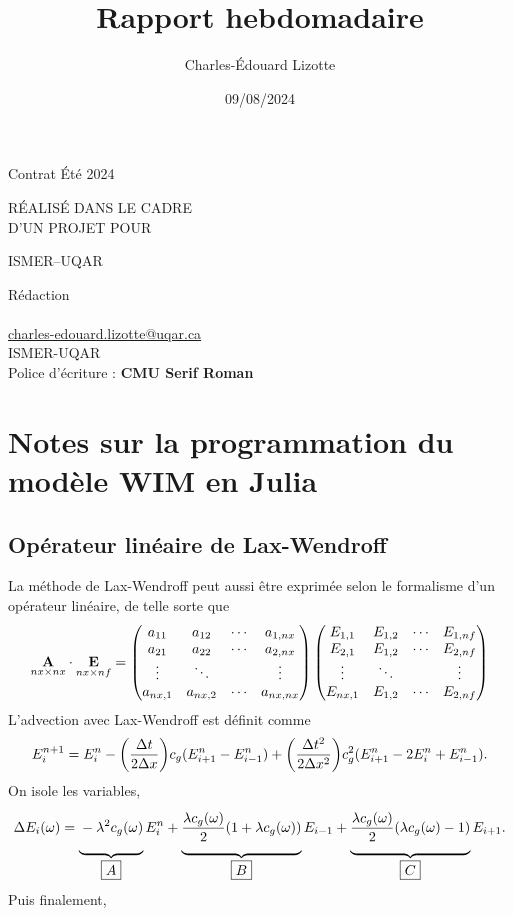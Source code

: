 \documentclass[10pt]{article}
\author{Charles-Édouard Lizotte}
\date{09/08/2024}
\title{Rapport hebdomadaire}
\makeatletter
\numberwithin{equation}{section}
\newcommand{\venti}{\vphantom{\sum_x^x}}
\newcommand{\mytitlepage}{
\begin{titlepage}
\begin{center}
{\Huge \thesubtitle \par}
\vspace{2cm}
{\Huge \MakeUppercase{\thetitle} \par}
\vspace{2cm}
RÉALISÉ DANS LE CADRE\\ D'UN PROJET POUR \par
\vspace{2cm}
{\Huge ISMER--UQAR \par}
\vspace{2cm}
{\thedate}
\end{center}
\vfill
Rédaction \\
{\theauthor}\\
\url{charles-edouard.lizotte@uqar.ca}\\
ISMER-UQAR\\
Police d'écriture : \textbf{CMU Serif Roman}
\end{titlepage}
}
\newcommand{\thesubtitle}{Contrat Été 2024}
\makeatother
\begin{document}
\mytitlepage
\tableofcontents\newpage
\section{Notes sur la programmation du modèle WIM en Julia}
\label{sec:org23d8782}

\subsection{Opérateur linéaire de Lax-Wendroff}
\label{sec:org9ca8214}
La méthode de Lax-Wendroff peut aussi être exprimée selon le formalisme d'un opérateur linéaire, de telle sorte que
\begin{equation}
   \underset{nx\times nx}{\mathbf{A}}\cdot\underset{nx\times nf}{\vb{E}} = \begin{pmatrix}
       a_{11} & a_{12} & \cdots & a_{1,nx} \\
       a_{21} & a_{22} & \cdots & a_{2,nx} \\
       \vdots & \ddots &  & \vdots \\
       a_{nx,1} & a_{nx,2} & \cdots & a_{nx,nx} \\
   \end{pmatrix}\begin{pmatrix}
       E_{1,1} & E_{1,2} & \cdots & E_{1,nf}\\ 
       E_{2,1} & E_{1,2} & \cdots & E_{2,nf}\\
       \vdots & \ddots &  & \vdots\\
       E_{nx,1} & E_{1,2} & \cdots & E_{2,nf}\\
   \end{pmatrix}
\end{equation}
L'advection avec Lax-Wendroff est définit comme
\begin{equation}
   E_i^{n+1} = E_i^{n} - \qty(\frac{\Delta t}{2 \Delta x}) c_g (E_{i+1}^n - E_{i-1}^n) + \qty(\frac{\Delta t^2}{2 \Delta x^2}) c_g^2 (E_{i+1}^n -2E_i^n + E_{i-1}^n).
\end{equation}
On isole les variables,
\begin{align}
   \Delta E_i(\omega) = \underbrace{\venti-\lambda^2 c_g(\omega)}_{\boxed{A}} E_i^n + \underbrace{\venti\frac{\lambda c_g(\omega)}{2} \qty(1 + \lambda c_g(\omega))}_{\boxed{B}}E_{i-1} + \underbrace{\venti\frac{\lambda c_g(\omega)}{2} \qty(\lambda c_g(\omega) -1)}_{\boxed{C}} E_{i+1}.
\end{align}
Puis finalement,
\end{document}
